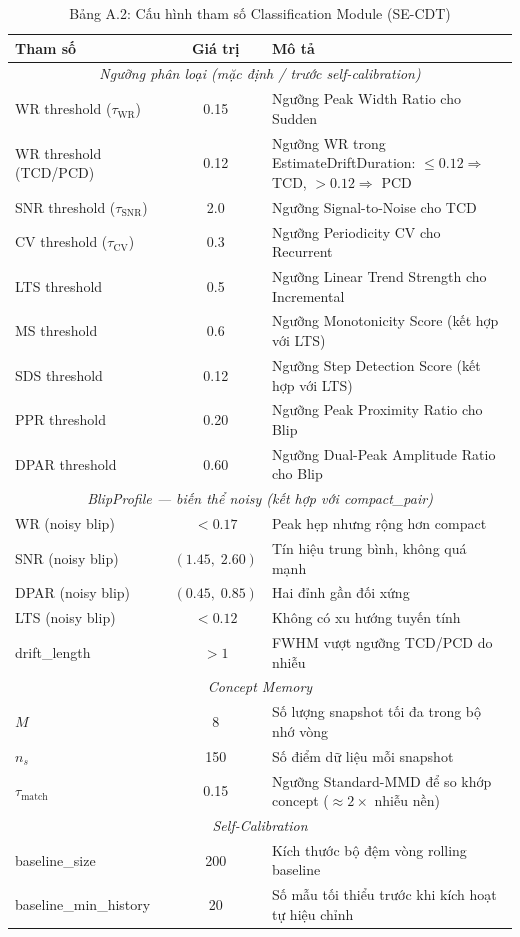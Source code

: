 \begin{table}[H]
	\centering
	\caption*{Bảng A.2: Cấu hình tham số Classification Module (SE-CDT)}
	\begin{tabular}{|l|c|p{7cm}|}
		\hline
		\textbf{Tham số} & \textbf{Giá trị} & \textbf{Mô tả} \\
		\hline
		\multicolumn{3}{|c|}{\textit{Ngưỡng phân loại (mặc định / trước self-calibration)}} \\
		\hline
		WR threshold ($\tau_{\text{WR}}$) & 0.15 & Ngưỡng Peak Width Ratio cho Sudden \\
		WR threshold (TCD/PCD) & 0.12 & Ngưỡng WR trong EstimateDriftDuration: $\leq 0.12 \Rightarrow$ TCD, $> 0.12 \Rightarrow$ PCD \\
		SNR threshold ($\tau_{\text{SNR}}$) & 2.0 & Ngưỡng Signal-to-Noise cho TCD \\
		CV threshold ($\tau_{\text{CV}}$) & 0.3 & Ngưỡng Periodicity CV cho Recurrent \\
		LTS threshold & 0.5 & Ngưỡng Linear Trend Strength cho Incremental \\
		MS threshold & 0.6 & Ngưỡng Monotonicity Score (kết hợp với LTS) \\
		SDS threshold & 0.12 & Ngưỡng Step Detection Score (kết hợp với LTS) \\
		PPR threshold & 0.20 & Ngưỡng Peak Proximity Ratio cho Blip \\
		DPAR threshold & 0.60 & Ngưỡng Dual-Peak Amplitude Ratio cho Blip \\
		\hline
		\multicolumn{3}{|c|}{\textit{BlipProfile --- biến thể noisy (kết hợp với compact\_pair)}} \\
		\hline
		WR (noisy blip) & $< 0.17$ & Peak hẹp nhưng rộng hơn compact \\
		SNR (noisy blip) & $(1.45,\; 2.60)$ & Tín hiệu trung bình, không quá mạnh \\
		DPAR (noisy blip) & $(0.45,\; 0.85)$ & Hai đỉnh gần đối xứng \\
		LTS (noisy blip) & $< 0.12$ & Không có xu hướng tuyến tính \\
		drift\_length & $> 1$ & FWHM vượt ngưỡng TCD/PCD do nhiễu \\
		\hline
		\multicolumn{3}{|c|}{\textit{Concept Memory}} \\
		\hline
			$M$ & 8 & Số lượng snapshot tối đa trong bộ nhớ vòng \\
			$n_s$ & 150 & Số điểm dữ liệu mỗi snapshot \\
		$\tau_{\text{match}}$ & 0.15 & Ngưỡng Standard-MMD để so khớp concept ($\approx 2\times$ nhiễu nền) \\
		\hline
		\multicolumn{3}{|c|}{\textit{Self-Calibration}} \\
		\hline
		baseline\_size & 200 & Kích thước bộ đệm vòng rolling baseline \\
		baseline\_min\_history & 20 & Số mẫu tối thiểu trước khi kích hoạt tự hiệu chỉnh \\
		\hline
	\end{tabular}
\end{table}

